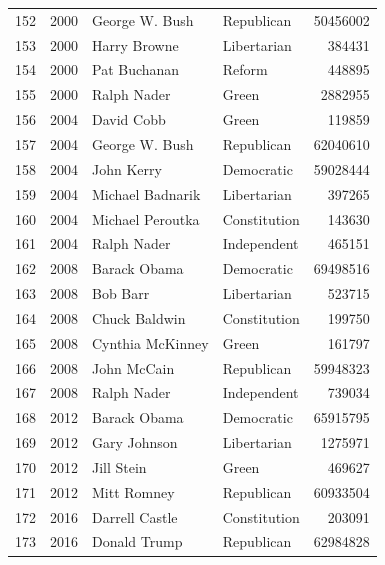 \documentclass[
  letterpaper,
  DIV=11,
  numbers=noendperiod]{scrreprt}
\begin{document}
\begin{tabular}{lrllr}
152 &  2000 &          George W. Bush &             Republican &      50456002 \\
153 &  2000 &            Harry Browne &            Libertarian &        384431 \\
154 &  2000 &            Pat Buchanan &                 Reform &        448895 \\
155 &  2000 &             Ralph Nader &                  Green &       2882955 \\
156 &  2004 &              David Cobb &                  Green &        119859 \\
157 &  2004 &          George W. Bush &             Republican &      62040610 \\
158 &  2004 &              John Kerry &             Democratic &      59028444 \\
159 &  2004 &        Michael Badnarik &            Libertarian &        397265 \\
160 &  2004 &        Michael Peroutka &           Constitution &        143630 \\
161 &  2004 &             Ralph Nader &            Independent &        465151 \\
162 &  2008 &            Barack Obama &             Democratic &      69498516 \\
163 &  2008 &                Bob Barr &            Libertarian &        523715 \\
164 &  2008 &           Chuck Baldwin &           Constitution &        199750 \\
165 &  2008 &        Cynthia McKinney &                  Green &        161797 \\
166 &  2008 &             John McCain &             Republican &      59948323 \\
167 &  2008 &             Ralph Nader &            Independent &        739034 \\
168 &  2012 &            Barack Obama &             Democratic &      65915795 \\
169 &  2012 &            Gary Johnson &            Libertarian &       1275971 \\
170 &  2012 &              Jill Stein &                  Green &        469627 \\
171 &  2012 &             Mitt Romney &             Republican &      60933504 \\
172 &  2016 &          Darrell Castle &           Constitution &        203091 \\
173 &  2016 &            Donald Trump &             Republican &      62984828 \\

\end{tabular}
\end{document}
